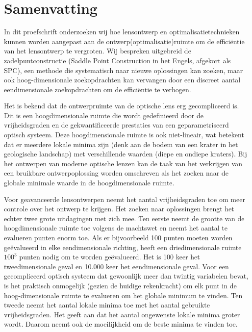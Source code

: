 \chapter*{Samenvatting}
{

\noindent 
In dit proefschrift onderzoeken wij hoe lensontwerp en optimalisatietechnieken kunnen worden aangepast aan de ontwerp(optimalisatie)ruimte om de efficiëntie van het lensontwerp te vergroten. Wij bespreken uitgebreid de zadelpuntconstructie (Saddle Point Construction in het Engels, afgekort als SPC), een methode die systematisch naar nieuwe oplossingen kan zoeken, maar ook hoog-dimensionale zoekopdrachten kan vervangen door een discreet aantal eendimensionale zoekopdrachten om de efficiëntie te verhogen.

Het is bekend dat de ontwerpruimte van de optische lens erg gecompliceerd is. Dit is een hoogdimensionale ruimte die wordt gedefinieerd door de vrijheidsgraden en de gekwantificeerde prestaties van een geparametriseerd optisch systeem. Deze hoogdimensionale ruimte is ook niet-lineair, wat betekent dat er meerdere lokale minima zijn (denk aan de bodem van een krater in het geologische landschap) met verschillende waarden (diepe en ondiepe kraters). Bij het ontwerpen van moderne optische lenzen kan de taak van het verkrijgen van een bruikbare ontwerpoplossing worden omschreven als het zoeken naar de globale minimale waarde in de hoogdimensionale ruimte.

Voor geavanceerde lensontwerpen neemt het aantal vrijheidsgraden toe om meer controle over het ontwerp te krijgen. Het zoeken naar oplossingen brengt het echter twee grote uitdagingen met zich mee. Ten eerste neemt de grootte van de hoogdimensionale ruimte toe volgens de machtswet en neemt het aantal te evalueren punten enorm toe. Als er bijvoorbeeld 100 punten moeten worden geëvalueerd in elke eendimensionale richting, heeft een driedimensionale ruimte $100^3$ punten nodig om te worden geëvalueerd. Het is 100 keer het tweedimensionale geval en 10.000 keer het eendimensionale geval. Voor een gecompliceerd optisch systeem dat gewoonlijk meer dan twintig variabelen bevat, is het praktisch onmogelijk (gezien de huidige rekenkracht) om elk punt in de hoog-dimensionale ruimte te evalueren om het globale minimum te vinden. Ten tweede neemt het aantal lokale minima toe met het aantal gebruikte vrijheidsgraden. Het geeft aan dat het aantal ongewenste lokale minima groter wordt. Daarom neemt ook de moeilijkheid om de beste minima te vinden toe.

}
